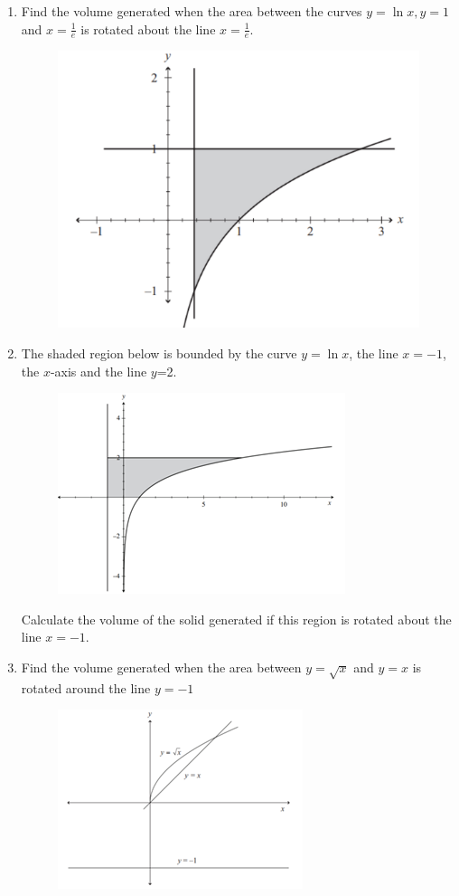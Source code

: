 \documentclass[../main.tex]{subfiles}
\begin{document}
\begin{enumerate}[itemsep=0.5cm]
    \item 
    Find the volume generated when the area between the curves $y=\ln{x}, y=1$ and $x=\frac{1}{e}$ is rotated about the line $x=\frac{1}{e}$.
    \begin{figure}[h]
        \centering
        \includegraphics{images/volrev13.png}
    \end{figure}

    \item 
    The shaded region below is bounded by the curve $y=\ln{x}$, the line $x=-1$, the $x$-axis and the line $y$=2.

    \begin{figure}[h]
        \centering
        \includegraphics[width=0.3\linewidth]{images/volrev14.png}
    \end{figure}

    Calculate the volume of the solid generated if this region is rotated about the line $x=-1$.

    \item 
    Find the volume generated when the area between $y=\sqrt{x}$ and $y=x$ is rotated around the line $y=-1$

    \begin{figure}[h]
        \centering
        \includegraphics{images/volrev15.png}
    \end{figure}


\end{enumerate}
\end{document}
